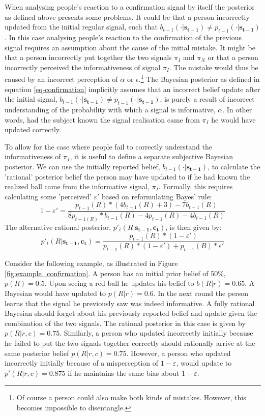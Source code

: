 \documentclass{article}
\begin{document}
When analysing people's reaction to a confirmation signal by itself the posterior as defined above presents some problems. It could be that a person incorrectly updated from the initial regular signal, such that $b_{t-1}(\cdot|\mathbf{s_{t-1}}) \neq p_{t-1}(\cdot|\mathbf{s_{t-1}})$. In this case analysing people's reaction to the confirmation of the previous signal requires an assumption about the cause of the initial mistake. It might be that a person incorrectly put together the two signals $\pi_I$ and $\pi_N$ or that a person incorrectly perceived the informativeness of signal $\pi_I$. The mistake would thus be caused by an incorrect perception of $\alpha$ or $\epsilon$.\footnote{Of course a person could also make both kinds of mistakes. However, this becomes impossible to disentangle.} The Bayesian posterior as defined in equation \ref{eq-confirmation} implicitly assumes that an incorrect belief update after the initial signal, $b_{t-1}(\cdot|\mathbf{s_{t-1}}) \neq p_{t-1}(\cdot|\mathbf{s_{t-1}})$, is purely a result of incorrect understanding of the probability with which a signal is informative, $\alpha$. In other words, had the subject known the signal realisation came from $\pi_I$ he would have updated correctly. 

To allow for the case where people fail to correctly understand the informativeness of $\pi_I$, it is useful to define a separate subjective Bayesian posterior. We can use the initially reported belief, $b_{t-1}(\cdot|\mathbf{s_{t-1}})$, to calculate the 'rational' posterior belief the person may have updated to if he had known the realized ball came from the informative signal, $\pi_I$. Formally, this requires calculating some 'perceived' $\varepsilon'$ based on reformulating Bayes' rule:
\begin{equation*}
    1-\varepsilon' = \frac{p_{t-1}(R)*(4b_{t-1}(R)+3)-7b_{t-1}(R)}{8p_{t-1(R)}*b_{t-1}(R)-4p_{t-1}(R)-4b_{t-1}(R)}
\end{equation*}
The alternative rational posterior, $p'_t(R|\mathbf{s_{t-1},\mathbf{c_t}})$, is then given by:
\begin{equation}
    \label{eq-confirmation-alt}
    p'_t(R|\mathbf{s_{t-1},\mathbf{c_t}})=\frac{p_{t-1}(R)*(1-\varepsilon')}{p_{t-1}(R)*(1-\varepsilon')+p_{t-1}(B)*\varepsilon'}
\end{equation}

Consider the following example, as illustrated in Figure \ref{fig:example_confirmation}. A person has an initial prior belief of 50\%, $p(R)=0.5$. Upon seeing a red ball he updates his belief to $b(R|r)=0.65$. A Bayesian would have updated to $p(R|r)=0.6$. In the next round the person learns that the signal he previously saw was indeed informative. A fully rational Bayesian should forget about his previously reported belief and update given the combination of the two signals. The rational posterior in this case is given by $p(R|r,c)=0.75$. Similarly, a person who updated incorrectly initially because he failed to put the two signals together correctly should rationally arrive at the same posterior belief $p(R|r,c)=0.75$. However, a person who updated incorrectly initially because of a misperception of $1-\varepsilon$, would update to $p'(R|r,c)=0.875$ if he maintains the same bias about $1-\varepsilon$.
\end{document}
